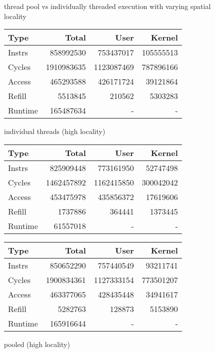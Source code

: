 \documentclass[11pt]{article}
\begin{document}
\begin{figure*}[!h]
	\caption{thread pool vs individually threaded execution with varying spatial locality}
	\label{fig:pooling}
	\centering
	\begin{subtable}{.48\textwidth}
		\centering
		\begin{tabular}{ l|rrr }
			Type    & Total      & User       & Kernel    \\
			\hline
			Instrs & 858992530 & 753437017 & 105555513 \\ 
			Cycles & 1910983635 & 1123087469 & 787896166 \\ 
			Access & 465293588 & 426171724 & 39121864 \\ 
			Refill & 5513845 & 210562 & 5303283 \\ 
			Runtime & 165487634 & - & - \\ 
			\hline
		\end{tabular}
		\caption{individual threads (high locality)}
	\end{subtable}
	\hfill
	\begin{subtable}{.48\textwidth} 
		\centering
		\begin{tabular}{ l|rrr }
			Type    & Total      & User       & Kernel    \\
			\hline
			Instrs & 825909448 & 773161950 & 52747498 \\ 
			Cycles & 1462457892 & 1162415850 & 300042042 \\ 
			Access & 453475978 & 435856372 & 17619606 \\ 
			Refill & 1737886 & 364441 & 1373445 \\ 
			Runtime & 61557018 & - & - \\
			\hline
		\end{tabular}
		\caption{pooled (high locality)}        
	\end{subtable}
	\begin{subtable}{.48\textwidth} 
		\centering
		\begin{tabular}{ l|rrr }
			Type    & Total      & User       & Kernel    \\
			\hline
			Instrs & 850652290 & 757440549 & 93211741 \\ 
			Cycles & 1900834361 & 1127333154 & 773501207 \\ 
			Access & 463377065 & 428435448 & 34941617 \\ 
			Refill & 5282763 & 128873 & 5153890 \\ 
			Runtime & 165916644 & - & - \\
			\hline
		\end{tabular}

\end{subtable}
\end{figure*}
\end{document}
